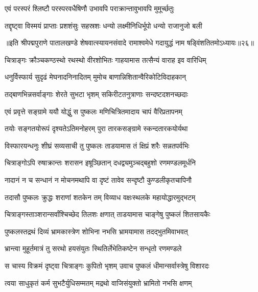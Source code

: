 \twolineshloka
{एवं परस्परं श्लिष्टौ परस्परवधैषिणौ}
{उभावपि पराक्रान्तावुभावपि मुमूर्च्छतुः}%

\twolineshloka
{तद्दृष्ट्वा विस्मयं प्राप्ताः प्रशशंसुः सहस्रशः}
{धन्यो लक्ष्मीनिधिर्भूपो धन्यो राजानुजो बली}%

{॥इति श्रीपद्मपुराणे पातालखण्डे शेषवात्स्यायनसंवादे रामाश्वमेधे गदायुद्धं नाम षड्विंशतितमोऽध्यायः॥२६॥}

\resetShloka


\twolineshloka
{चित्राङ्गः क्रौञ्चकण्ठस्थो रथस्थो वीरशोभितः}
{गाहयामास तत्सैन्यं वाराह इव वारिधिम्}%

\twolineshloka
{धनुर्विस्फार्य सुदृढं मेघनादनिनादितम्}
{मुमोच बाणान्निशितान्वैरिकोटिविदाहकान्}%

\twolineshloka
{तद्बाणभिन्नसर्वाङ्गाः शेरते सुभटा भृशम्}
{सकिरीटतनुत्राणाः सन्दष्टदशनच्छदाः}%

\twolineshloka
{एवं प्रवृत्ते सङ्ग्रामे ययौ योद्धुं स पुष्कलः}
{मणिचित्रितमादाय चापं वैरिप्रतापनम्}%

\twolineshloka
{तयोः सङ्गतयोरूपं दृश्यतेऽतिमनोहरम्}
{पुरा तारकसङ्ग्रामे स्कन्दतारकयोर्यथा}%

\twolineshloka
{विस्फारयन्धनुः शीघ्रं सव्यसाची तु पुष्कलः}
{ताडयामास तं क्षिप्रं शरैः सन्नतपर्वभिः}%

\twolineshloka
{चित्राङ्गोऽपि रुषाक्रान्तः शरासन इषूञ्छितान्}
{दधद्व्यमुञ्चद्बहुशो रणमण्डलमूर्धनि}%

\twolineshloka
{नादानं न च सन्धानं न मोचनमथापि वा}
{दृष्टं तावेव सन्दृष्टौ कुण्डलीकृतचापिनौ}%

\twolineshloka
{तदासौ पुष्कलः क्रुद्धः शराणां शतकेन तम्}
{विव्याध वक्षःस्थलके महायोद्धारमुद्भटम्}%

\twolineshloka
{चित्राङ्गस्ताञ्शरान्सर्वांश्चिच्छेद तिलशः क्षणात्}
{ताडयामास चाङ्गेषु पुष्कलं शितसायकैः}%

\twolineshloka
{पुष्कलस्तद्रथं दिव्यं भ्रामकास्त्रेण शोभिना}
{नभसि भ्रामयामास तदद्भुतमिवाभवत्}%

\twolineshloka
{भ्रान्त्वा मुहूर्तमात्रं तु सरथो हयसंयुतः}
{स्थितिर्लेभेतिकष्टेन सन्धृतो रणमण्डले}%

\twolineshloka
{स चास्य विक्रमं दृष्ट्वा चित्राङ्गः कुपितो भृशम्}
{उवाच पुष्कलं धीमान्सर्वास्त्रेषु विशारदः}%


\twolineshloka
{त्वया साधुकृतं कर्म सुभटैर्युधिसम्मतम्}
{मद्रथो वाजिसंयुक्तो भ्रामितो नभसि क्षणम्}%

